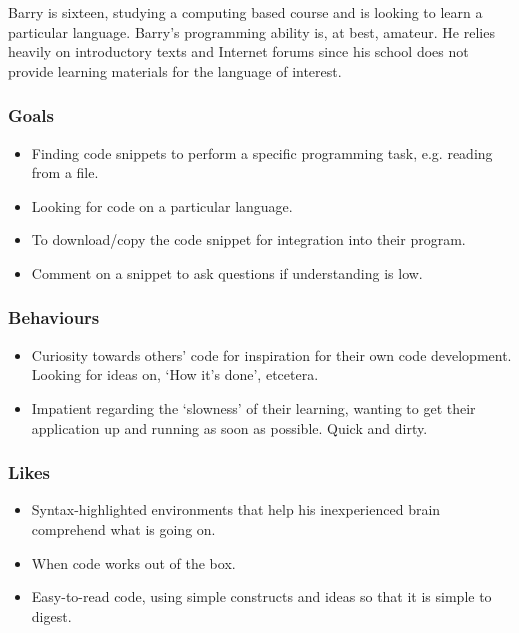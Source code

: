 \documentclass{sig-alt-release2}
\begin{document}
Barry is sixteen, studying a computing based course and is looking to
learn a particular language. Barry's programming ability is, at best,
amateur. He relies heavily on introductory texts and Internet forums
since his school does not provide learning materials for the language
of interest.

\subsubsection{Goals}

\begin{itemize}
\item Finding code snippets to perform a specific programming task,
e.g. reading from a file.
\item Looking for code on a particular language.
\item To download/copy the code snippet for integration into their
program.
\item Comment on a snippet to ask questions if understanding is low.
\end{itemize}

\subsubsection{Behaviours}

\begin{itemize}
\item Curiosity towards others' code for inspiration for their own code
development. Looking for ideas on, `How it's done', etcetera.
\item Impatient regarding the `slowness' of their learning, wanting to
get their application up and running as soon as possible. Quick and
dirty.
\end{itemize}

\subsubsection{Likes}

\begin{itemize}
\item Syntax-highlighted environments that help his inexperienced brain
comprehend what is going on.
\item When code works out of the box.
\item Easy-to-read code, using simple constructs and ideas so that it
is simple to digest.
\end{itemize}
\end{document}
